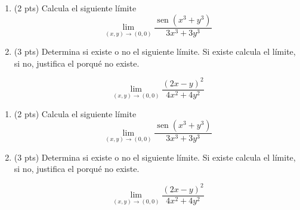 \documentclass[12pt]{article}
\newcommand{\sen}{\operatorname{sen}}
\begin{document}
\bigskip

            
\bigskip
\bigskip
\bigskip


\begin{enumerate}

\item (2 pts) Calcula el siguiente  l\'imite
$$
\lim_{(x,y)\to (0,0)} \frac{\sen(x^3+y^3)}{3x^3+3y^3}
$$
  
\vspace{1.5cm}  
  
\item (3 pts) Determina si existe o no el siguiente l\'imite. Si existe calcula el l\'imite,  si no, justifica el porqu\'e no existe.

$$
\lim_{(x,y) \to (0,0)} \frac{(2x-y)^2}{4x^2+4y^2}
$$



  \end{enumerate}


  \vspace{2.5cm}
  
  
\bigskip

            
\bigskip
\bigskip
\bigskip


\begin{enumerate}

\item (2 pts) Calcula el siguiente  l\'imite
$$
\lim_{(x,y)\to (0,0)} \frac{\sen(x^3+y^3)}{3x^3+3y^3}
$$
  
\vspace{1.5cm}  
  
\item (3 pts) Determina si existe o no el siguiente l\'imite. Si existe calcula el l\'imite,  si no, justifica el porqu\'e no existe.

$$
\lim_{(x,y) \to (0,0)} \frac{(2x-y)^2}{4x^2+4y^2}
$$



  \end{enumerate}

  
\end{document}
